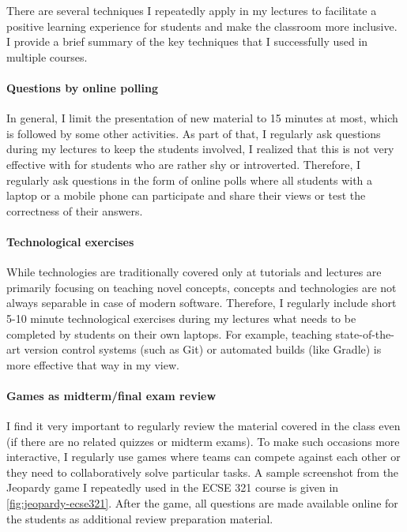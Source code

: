 \documentclass[a4paper,11pt]{article}
\begin{document}
There are several techniques I repeatedly apply in my lectures to facilitate a positive learning experience for students and make the classroom more inclusive. I provide a brief summary of the key techniques that I successfully used in multiple courses. 

\paragraph{Questions by online polling}
In general, I limit the presentation of new material to 15 minutes at most, which is followed by some other activities. As part of that, I regularly ask questions during my lectures to keep the students involved, I realized that this is not very effective with for students who are rather shy or introverted. Therefore, I regularly ask questions in the form of online polls where all students with a laptop or a mobile phone can participate and share their views or test the correctness of their answers. 

\paragraph{Technological exercises}
While technologies are traditionally covered only at tutorials and lectures are primarily focusing on teaching novel concepts, concepts and technologies are not always separable in case of modern software. Therefore, I regularly include short 5-10 minute technological exercises during my lectures what needs to be completed by students on their own laptops. For example, teaching state-of-the-art version control systems (such as Git) or automated builds (like Gradle) is more effective that way in my view. 

\paragraph{Games as midterm/final exam review}
I find it very important to regularly review the material covered in the class even (if there are no related quizzes or midterm exams). To make such occasions more interactive, I regularly use games where teams can compete against each other or they need to collaboratively solve particular tasks. A sample screenshot from the Jeopardy game I repeatedly used in the ECSE 321 course is given in \autoref{fig:jeopardy-ecse321}. After the game, all questions are made available online for the students as additional review preparation material.
\end{document}

